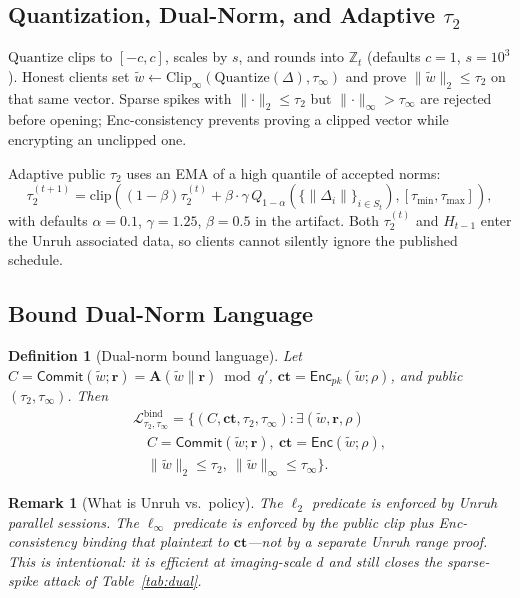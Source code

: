 \documentclass[conference]{IEEEtran}
\newtheorem{definition}{Definition}
\newtheorem{remark}{Remark}
\newcommand{\norm}[1]{\lVert #1 \rVert}
\newcommand{\Enc}{\mathsf{Enc}}
\newcommand{\Commit}{\mathsf{Commit}}
\begin{document}
\subsection{Quantization, Dual-Norm, and Adaptive $\tau_2$}
$\mathrm{Quantize}$ clips to $[-c,c]$, scales by $s$, and rounds into $\mathbb{Z}_t$ (defaults $c{=}1$, $s{=}10^{3}$). Honest clients set $\tilde{w}\leftarrow\mathrm{Clip}_\infty(\mathrm{Quantize}(\Delta),\tau_\infty)$ and prove $\norm{\tilde{w}}_2\le\tau_2$ on that same vector. Sparse spikes with $\norm{\cdot}_2\le\tau_2$ but $\norm{\cdot}_\infty>\tau_\infty$ are rejected before opening; Enc-consistency prevents proving a clipped vector while encrypting an unclipped one.

Adaptive public $\tau_2$ uses an EMA of a high quantile of accepted norms:
\begin{equation}
\tau_2^{(t+1)}=\mathrm{clip}\!\left((1-\beta)\tau_2^{(t)}+\beta\cdot \gamma\, Q_{1-\alpha}(\{\norm{\Delta_i}\}_{i\in S_t}),[\tau_{\min},\tau_{\max}]\right),
\end{equation}
with defaults $\alpha{=}0.1$, $\gamma{=}1.25$, $\beta{=}0.5$ in the artifact. Both $\tau_2^{(t)}$ and $H_{t-1}$ enter the Unruh associated data, so clients cannot silently ignore the published schedule.

\subsection{Bound Dual-Norm Language}
\begin{definition}[Dual-norm bound language]
Let $C=\Commit(\tilde{w};\mathbf{r})=\mathbf{A}(\tilde{w}\|\mathbf{r})\bmod q'$,
$\mathbf{ct}=\Enc_{pk}(\tilde{w};\rho)$, and public $(\tau_2,\tau_\infty)$. Then
\begin{multline}
\mathcal{L}_{\tau_2,\tau_\infty}^{\mathrm{bind}}=
\bigl\{(C,\mathbf{ct},\tau_2,\tau_\infty):\exists(\tilde{w},\mathbf{r},\rho)\\
\quad C=\Commit(\tilde{w};\mathbf{r}),\
\mathbf{ct}=\Enc(\tilde{w};\rho),\\
\quad \norm{\tilde{w}}_2\le\tau_2,\
\norm{\tilde{w}}_\infty\le\tau_\infty\bigr\}.
\end{multline}
\end{definition}

\begin{remark}[What is Unruh vs.\ policy]
The $\ell_2$ predicate is enforced by Unruh parallel sessions. The $\ell_\infty$ predicate is enforced by the public clip \emph{plus} Enc-consistency binding that plaintext to $\mathbf{ct}$---not by a separate Unruh range proof. This is intentional: it is efficient at imaging-scale $d$ and still closes the sparse-spike attack of Table~\ref{tab:dual}.
\end{remark}
\end{document}
